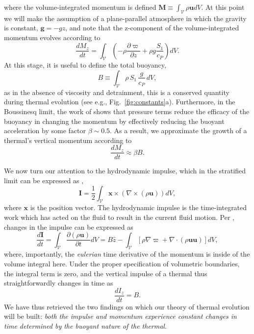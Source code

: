 \documentclass[twocolumn, amsmath, amsfonts, amssymb, trackchanges]{aastex62}
\newcommand{\Div}[1]{\ensuremath{\nabla\cdot\left( #1\right)}}
\newcommand{\grad}{\ensuremath{\nabla}}
\begin{document}
where the volume-integrated momentum is defined $\bm{M} \equiv \int_{\mathcal{V}}\rho\bm{u} dV$.
At this point we will make the assumption of a plane-parallel atmosphere in which the gravity is constant, $\bm{g} = -g\hat{z}$, and note that the z-component of the volume-integrated momentum evolves according to
\begin{equation}
\frac{d M_z}{dt} = \int_{\mathcal{V}}\left( -\rho\frac{\partial \varpi}{\partial z} + \rho g \frac{S_1}{c_P} \right)dV.
\label{eqn:Mz_definition}
\end{equation}
At this stage, it is useful to define the total buoyancy,
\begin{equation}
B \equiv \int_{\mathcal{V}} \rho\, S_1\, \frac{g}{c_P}\, dV,
\label{eqn:tot_buoyancy}
\end{equation}
as in the absence of viscosity and detrainment, this is a conserved quantity during thermal evolution (see e.g., Fig.~\ref{fig:constants}a). 
Furthermore, in the Boussinesq limit, the work of \citet{tarshish&all2018} shows that pressure terms reduce the efficacy of the buoyancy in changing the momentum by effectively reducing the buoyant acceleration by some factor $\beta \sim 0.5$. 
As a result, we approximate the growth of a thermal's vertical momentum according to
\begin{equation}
\frac{d M_z}{dt} \approx \beta B.
\label{eqn:theory_momentum}
\end{equation}

We now turn our attention to the hydrodynamic impulse, which in the stratified limit can be expressed as \citep{shivamoggi2010},
\begin{equation}
\bm{I} = \frac{1}{2}\int_{\mathcal{V}} \bm{x}\times(\grad\times(\rho\bm{u}))dV,
\end{equation}
where $\bm{x}$ is the position vector. 
The hydrodynamic impulse is the time-integrated work which has acted on the fluid to result in the current fluid motion. 
Per \citet{shivamoggi2010}, changes in the impulse can be expressed as
\begin{equation*}
\frac{d\bm{I}}{d t} = \int_{\mathcal{V}}\frac{\partial(\rho\bm{u})}{\partial t}dV
= B\hat{z} - \int_{\mathcal{V}}\left[\rho\grad\varpi + \Div{\rho\bm{u}\bm{u}}\right]dV ,
\end{equation*}
where, importantly, the \emph{eulerian} time derivative of the momentum is inside of the volume integral here. 
Under the proper specification of volumetric boundaries, the integral term is zero, and the vertical impulse of a thermal thus straightforwardly changes in time as
\begin{equation}
\frac{d I_z}{d t} = B.
\label{eqn:change_in_impulse}
\end{equation}
We have thus retrieved the two findings on which our theory of thermal evolution will be built: \emph{both the impulse and momentum experience constant changes in time determined by the buoyant nature of the thermal}.
\end{document}
